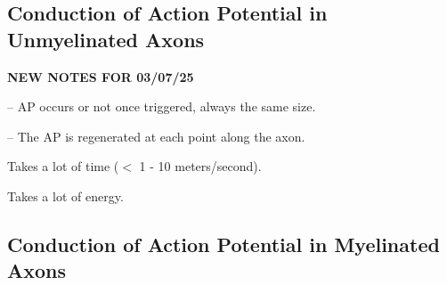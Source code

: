 \subsection{Conduction of Action Potential in Unmyelinated Axons}

\begin{center}
    \textbf{NEW NOTES FOR 03/07/25} \\
    \hrulefill
\end{center}

\begin{coloredlist}
    \item {} -- AP occurs or not once triggered, always the same size.
    \item {} -- The AP is regenerated at each point along the axon.
    \begin{coloredlist}
        \item Takes a lot of time (\(<\) 1 - 10 meters/second).
        \item Takes a lot of energy.
    \end{coloredlist}
\end{coloredlist}

\subsection{Conduction of Action Potential in Myelinated Axons}

